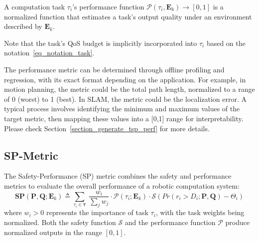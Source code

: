 	\begin{definition}
    \label{def_perf_metric}
		A computation task $\tau_i$'s performance function $\mathcal{P}(\tau_i, \textbf{E}_k) \rightarrow [0,1]$ is a normalized function that estimates a task's output quality under an environment described by $\textbf{E}_k$.
	\end{definition}

	Note that the task's QoS budget is implicitly incorporated into $\tau_i$ based on the notation~\eqref{eq_notation_task}.

    The performance metric can be determined through offline profiling and regression, with its exact format depending on the application.
    For example, in motion planning, the metric could be the total path length, normalized to a range of 0 (worst) to 1 (best).
    In SLAM, the metric could be the localization error.
    A typical process involves identifying the minimum and maximum values of the target metric, then mapping these values into a [0,1] range for interpretability.
    Please check Section~\ref{section_generate_tsp_perf} for more details.

	\subsection{SP-Metric}
	The Safety-Performance (SP) metric combines the safety and performance metrics to evaluate the overall performance of a robotic computation system:
	\begin{equation}
		\textbf{SP}(\boldsymbol{P}, \boldsymbol{Q}; \textbf{E}_k) \triangleq \sum_{\tau_i \in \boldsymbol{\tau}} \
		\frac{w_i}{\sum_j w_j} \cdot \mathcal{P}(\tau_i; \textbf{E}_k) \cdot
		\mathcal{S}(Pr(r_i > D_i ; \boldsymbol{P}, \boldsymbol{Q}) - \Theta_i)
		\label{eq_sp_def}
	\end{equation}
	where $w_i > 0$ represents the importance of task $\tau_i$, with the task weights being normalized.
    Both the safety function $\mathcal{S}$ and the performance function $\mathcal{P}$ produce normalized outputs in the range $[0,1]$.



